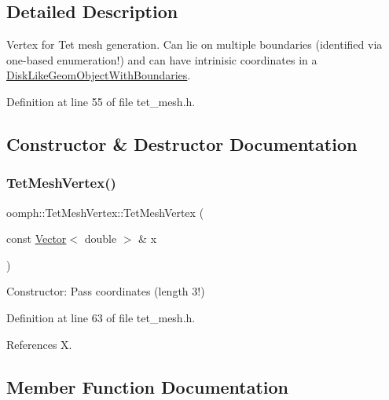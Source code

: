 \subsection{Detailed Description}
Vertex for Tet mesh generation. Can lie on multiple boundaries (identified via one-\/based enumeration!) and can have intrinisic coordinates in a \hyperlink{classoomph_1_1DiskLikeGeomObjectWithBoundaries}{Disk\+Like\+Geom\+Object\+With\+Boundaries}. 

Definition at line 55 of file tet\+\_\+mesh.\+h.



\subsection{Constructor \& Destructor Documentation}
\mbox{\label{classoomph_1_1TetMeshVertex_af76c065906c82fa548ce145b6d34e7e1}} 
\subsubsection{\texorpdfstring{Tet\+Mesh\+Vertex()}{TetMeshVertex()}}
{\footnotesize\ttfamily oomph\+::\+Tet\+Mesh\+Vertex\+::\+Tet\+Mesh\+Vertex (\begin{DoxyParamCaption}\item[{const \hyperlink{classoomph_1_1Vector}{Vector}$<$ double $>$ \&}]{x }\end{DoxyParamCaption})\hspace{0.3cm}{\ttfamily [inline]}}



Constructor\+: Pass coordinates (length 3!) 



Definition at line 63 of file tet\+\_\+mesh.\+h.



References X.



\subsection{Member Function Documentation}
\mbox{\label{classoomph_1_1TetMeshVertex_a844ff66de0e3ed28b3ad186c81e6d0c7}} 
